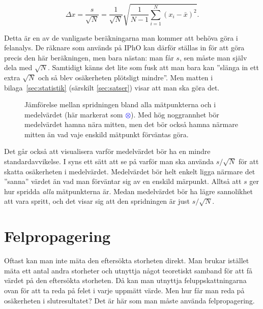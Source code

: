 \documentclass[11pt,a4paper, swedish
]{article}
\begin{document}
{\Large
\begin{equation} \label{eq:Delta_x}
\Delta{x} = \frac{s}{\sqrt{N}} 
= \frac{1}{\sqrt{N}} \sqrt{\frac{1}{N-1}\sum_{i=1}^N (x_i-\bar{x})^2}.
\end{equation}
}

Detta är en av de vanligaste beräkningarna man kommer att behöva göra
i felanalys. De räknare som används på IPhO kan därför ställas in för
att göra precis den här beräkningen, men bara nästan: man får $s$, sen
måste man själv dela med $\sqrt{N}$. Samtidigt känns det lite som fusk
att man bara kan ''slänga in ett extra $\sqrt{N}$ och så blev
osäkerheten plötsligt mindre''.\footnotemark{} Men matten i
bilaga~\ref{sec:statistik} (särskilt \ref{sec:satser}) visar att man
ska göra det. 

\begin{figure}
\centering

\caption{Jämförelse mellan spridningen bland alla mätpunkterna och i
  medelvärdet (här markerat som \textcolor{blue}{$\otimes$}). Med hög
  noggrannhet bör medelvärdet hamna nära mitten, men det bör också
  hamna närmare mitten än vad vaje enskild mätpunkt förväntas göra. } 
\label{fig:std_mean}
\end{figure}

Det går också att visualisera varför medelvärdet bör ha en mindre
standardavvikelse.
I  syns ett sätt att se på varför man ska använda
$s/\sqrt{N}$ för att skatta osäkerheten i medelvärdet. Medelvärdet bör
helt enkelt ligga närmare det ''sanna'' värdet än vad man förväntar
sig av en enskild märpunkt. Alltså att $s$ ger hur spridda \emph{alla}
mätpunkterna är. Medan medelvärdet bör ha lägre sannolikhet att vara
spritt, och det visar sig att den spridningen är just $s/\sqrt{N}$. 


\section{Felpropagering}
Oftast kan man inte mäta den eftersökta storheten direkt. Man brukar
istället mäta ett antal andra storheter och utnyttja något teoretiskt
samband för att få värdet på den eftersökta storheten. Då kan man
utnyttja feluppskattningarna ovan för att ta reda på felet i varje
uppmätt värde. Men hur får man reda på osäkerheten i slutresultatet?
Det är här som man måste använda felpropagering. 
\end{document}
